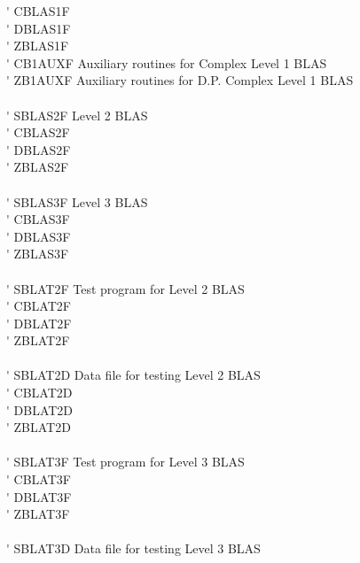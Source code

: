 \begin{tabbing}
 \> \titem \' \> CBLAS1F \> \\
 \> \titem \' \> DBLAS1F \> \\
 \> \titem \' \> ZBLAS1F \> \\
 \> \titem \' \> CB1AUXF \> Auxiliary routines for Complex Level 1 BLAS \\
 \> \titem \' \> ZB1AUXF \> Auxiliary routines for D.P. Complex Level 1 BLAS \\
\vspace{0.1ex} \\
 \> \titem \' \> SBLAS2F \> Level 2 BLAS \\
 \> \titem \' \> CBLAS2F \> \\
 \> \titem \' \> DBLAS2F \> \\
 \> \titem \' \> ZBLAS2F \> \\
\vspace{0.1ex} \\
 \> \titem \' \> SBLAS3F \> Level 3 BLAS \\
 \> \titem \' \> CBLAS3F \> \\
 \> \titem \' \> DBLAS3F \> \\
 \> \titem \' \> ZBLAS3F \> \\
\vspace{0.1ex} \\
 \> \titem \' \> SBLAT2F \> Test program for Level 2 BLAS \\
 \> \titem \' \> CBLAT2F \> \\
 \> \titem \' \> DBLAT2F \> \\
 \> \titem \' \> ZBLAT2F \> \\
\vspace{0.1ex} \\
 \> \titem \' \> SBLAT2D \> Data file for testing Level 2 BLAS \\
 \> \titem \' \> CBLAT2D \> \\
 \> \titem \' \> DBLAT2D \> \\
 \> \titem \' \> ZBLAT2D \> \\
\vspace{0.1ex} \\
 \> \titem \' \> SBLAT3F \> Test program for Level 3 BLAS \\
 \> \titem \' \> CBLAT3F \> \\
 \> \titem \' \> DBLAT3F \> \\
 \> \titem \' \> ZBLAT3F \> \\
\vspace{0.1ex} \\
 \> \titem \' \> SBLAT3D \> Data file for testing Level 3 BLAS \\

\end{tabbing}
